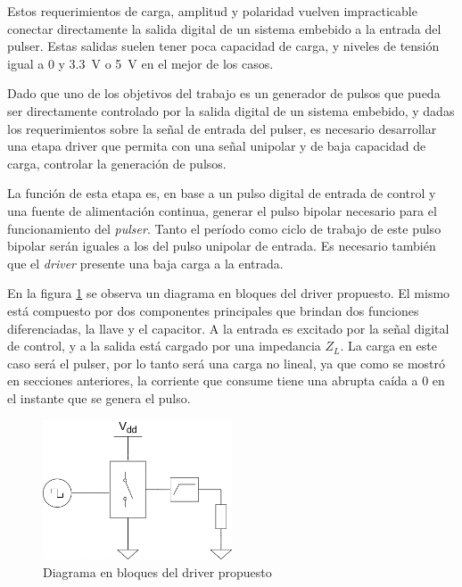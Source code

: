 Estos requerimientos de carga, amplitud y polaridad vuelven impracticable conectar
directamente la salida digital de un sistema embebido a la entrada del pulser.
Estas salidas suelen tener poca capacidad de carga, y niveles de tensión igual a
$0$ y \qty{3.3}{\volt} o \qty{5}{\volt} en el mejor de los casos.

Dado que uno de los objetivos del trabajo es un generador de pulsos que pueda
ser directamente controlado por la salida digital de un sistema embebido, y
dadas los requerimientos sobre la señal de entrada del pulser, es necesario
desarrollar una etapa driver que permita con una señal unipolar y de baja
capacidad de carga, controlar la generación de pulsos.

La función de esta etapa es, en base a un pulso digital de entrada de control y
una fuente de alimentación continua, generar el pulso bipolar necesario para el
funcionamiento del \textit{pulser}. Tanto el período como ciclo de trabajo de
este pulso bipolar serán iguales a los del pulso unipolar de entrada. Es
necesario también que el \textit{driver} presente una baja carga a la entrada.

En la figura \ref{fig:driver_block_diagram} se observa un diagrama en bloques
del driver propuesto. El mismo está compuesto por dos componentes principales
que brindan dos funciones diferenciadas, la llave y el capacitor. A la entrada
es excitado por la señal digital de control, y a la salida está cargado por una
impedancia $Z_L$. La carga en este caso será el pulser, por lo tanto será una
carga no lineal, ya que como se mostró en secciones anteriores, la corriente que
consume tiene una abrupta caída a 0 en el instante que se genera el pulso.

\begin{figure}[tbp]
    \centering
    \includegraphics[width=0.5\textwidth]{images/driver.drawio.png}
    \caption{Diagrama en bloques del driver propuesto}
    \label{fig:driver_block_diagram}
\end{figure}

